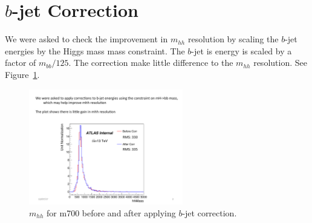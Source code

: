 \section{$b$-jet Correction}
We were asked to check the improvement in $m_{hh}$ resolution by scaling the $b$-jet energies by the Higgs mass mass constraint. The $b$-jet is energy is scaled by a factor of $m_{bb}/125$. The correction make little difference to the $m_{hh}$ resolution. See Figure~\ref{fig:mhh_res}. 

\begin{figure}[!h]
\begin{center}
\includegraphics*[width=0.60\textwidth] {figures//hhMass_bjet_corrected.pdf}
\caption[$m_{hh}$ for m700 before and after applying $b$-jet correction.]{$m_{hh}$ for m700 before and after applying $b$-jet correction.}
\label{fig:mhh_res}
\end{center}
\end{figure}